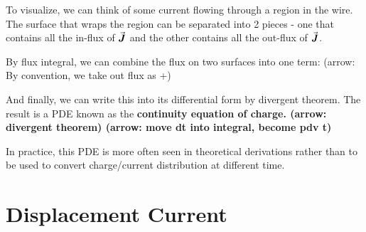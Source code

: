 \documentclass[class=article, crop=false, 12pt]{standalone}
\begin{document}
To visualize, we can think of some current flowing through a region in the wire.
The surface that wraps the region can be separated into 2 pieces - 
one that contains all the in-flux of $\va*{J}$ 
and the other contains all the out-flux of $\va*{J}$.


By flux integral, we can combine the flux on two surfaces into one term:
(arrow: By convention, we take out flux as +)

And finally, we can write this into its differential form by divergent theorem.
The result is a PDE known as the \bf{continuity equation of charge}.
(arrow: divergent theorem)
(arrow: move dt into integral, become pdv t)

In practice, this PDE is more often seen in theoretical derivations
rather than to be used to convert charge/current distribution at different time.



\linesep
\section{Displacement Current}
\end{document}
